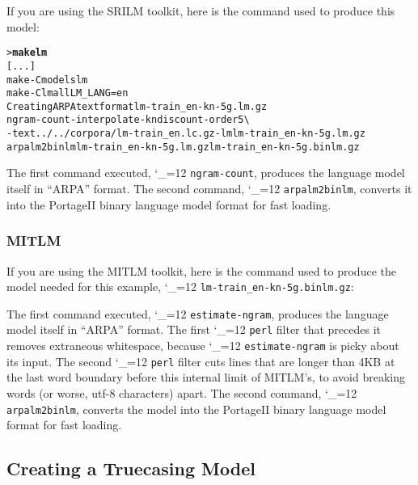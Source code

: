 \documentclass[11pt,letterpaper]{article}
\newcommand{\bs}{\textbackslash{}}
\newcommand{\PS}{PortageII\xspace}
\def\code{\begingroup\catcode`\_=12 \codex}
\newcommand{\codex}[1]{\texttt{#1}\endgroup}
\begin{document}
If you are using the SRILM toolkit, here is the command used to produce this
model:
\begin{small}
\begin{alltt}
   > \textbf{make lm}
   [...]
   make -C models lm
   make -C lm all LM_LANG=en
   Creating ARPA text format lm-train_en-kn-5g.lm.gz
   ngram-count -interpolate -kndiscount -order 5 \bs
      -text ../../corpora/lm-train_en.lc.gz -lm lm-train_en-kn-5g.lm.gz
   arpalm2binlm lm-train_en-kn-5g.lm.gz lm-train_en-kn-5g.binlm.gz
\end{alltt}
\end{small}
The first command executed, \code{ngram-count}, produces the language model
itself in ``ARPA'' format.  The second command, \code{arpalm2binlm},
converts it into the \PS binary language model format for fast loading.


\subsubsection{MITLM}

If you are using the MITLM toolkit, here is the command used to produce the
model needed for this example, \code{lm-train_en-kn-5g.binlm.gz}:
The first command executed, \code{estimate-ngram}, produces the language model
itself in ``ARPA'' format.  The first \code{perl} filter that precedes it
removes extraneous whitespace, because \code{estimate-ngram} is picky about its
input.  The second \code{perl} filter cuts lines that are longer than 4KB at
the last word boundary before this internal limit of MITLM's, to avoid breaking
words (or worse, utf-8 characters) apart.  The second command,
\code{arpalm2binlm}, converts the model into the \PS binary language model
format for fast loading.


\subsection{Creating a Truecasing Model} \label{TC}
\end{document}
